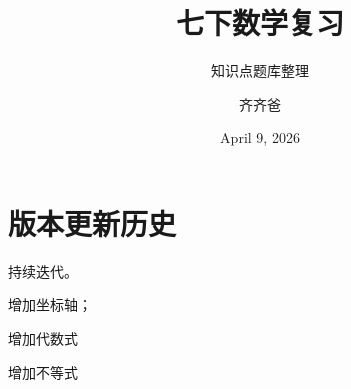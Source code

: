 \documentclass[lang=cn,10pt]{elegantbook}
\title{七下数学复习}
\subtitle{知识点题库整理}
\author{齐齐爸}
\institute{珠江骏景课题组}
\date{April 9, 2026}
\begin{document}
\maketitle
\frontmatter

\tableofcontents

\mainmatter
















%


\chapter{版本更新历史}

持续迭代。



\begin{change}
  \item 增加坐标轴；
\end{change}



\begin{change}
  \item 增加代数式
  \item 增加不等式
\end{change}








\end{document}
